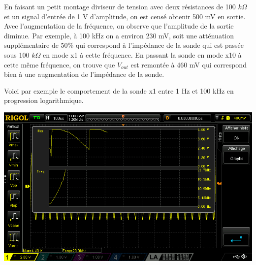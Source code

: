 \documentclass{../template/labo}
\begin{document}
{
	En faisant un petit montage diviseur de tension avec deux résistances de 100 $k\Omega$ et un signal d'entrée de 1 V d'amplitude, on est censé obtenir 500 mV en sortie.
	Avec l'augmentation de la fréquence, on observe que l'amplitude de la sortie diminue.
	Par exemple, à 100 kHz on a environ 230 mV, soit une atténuation supplémentaire de 50\% qui correspond à l'impédance de la sonde qui est passée sous 100 $k\Omega$ en mode x1 à cette fréquence.
	En passant la sonde en mode x10 à cette même fréquence, on trouve que $V_{out}$ est remontée à 460 mV qui correspond bien à une augmentation de l'impédance de la sonde.

	Voici par exemple le comportement de la sonde x1 entre 1 Hz et 100 kHz en progression logarithmique.
	\begin{center}
	\includegraphics[width=.8\textwidth]{DS1Z_probex1_sweep_1Hz_100kHz_log.png}
	\end{center}
}



\end{document}
